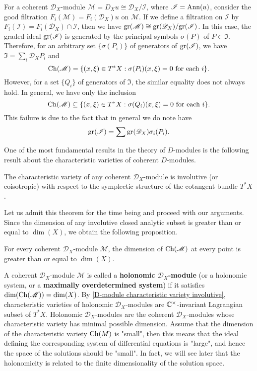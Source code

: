 \begin{example}
For a coherent $\mathscr{D}_X$-module $\mathscr{M}=D_Xu\cong\mathscr{D}_X/\mathscr{I}$, where $\mathscr{I}=\mathrm{Ann}(u)$, consider the good filtration $F_i(\mathscr{M})=F_i(\mathscr{D}_X)u$ on $\mathscr{M}$. If we define a filtration on $\mathscr{I}$ by $F_i(\mathscr{I})=F_i(\mathscr{D}_X)\cap\mathscr{I}$, then we have $\mathrm{gr}(\mathscr{M})\cong\mathrm{gr}(\mathscr{D}_X)/\mathrm{gr}(\mathscr{I})$. In this case, the graded ideal $\mathrm{gr}(\mathscr{I})$ is generated by the principal symbols $\sigma(P)$ of $P\in\mathfrak{I}$. Therefore, for an arbitrary set $\{\sigma(P_i)\}$ of generators of $\mathrm{gr}(\mathscr{I})$, we have $\mathfrak{I}=\sum_i\mathscr{D}_XP_i$ and
\[\mathrm{Ch}(\mathscr{M})=\{(x,\xi)\in T^*X:\text{$\sigma(P_i)(x,\xi)=0$ for each $i$}\}.\]
However, for a set $\{Q_i\}$ of generators of $\mathfrak{I}$, the similar equality does not always hold. In general, we have only the inclusion
\[\mathrm{Ch}(\mathscr{M})\subseteq\{(x,\xi)\in T^*X:\text{$\sigma(Q_i)(x,\xi)=0$ for each $i$}\}.\]
This failure is due to the fact that in general we do note have
\[\mathrm{gr}(\mathscr{I})=\sum\mathrm{gr}(\mathscr{D}_X)\sigma_i(P_i).\]
\end{example}

One of the most fundamental results in the theory of $D$-modules is the following result about the characteristic varieties of coherent $D$-modules.

\begin{theorem}\label{D-module characteristic variety involutive}
The characteristic variety of any coherent $\mathscr{D}_X$-module is involutive (or coisotropic) with respect to the symplectic structure of the cotangent bundle $T^*X$.
\end{theorem}

Let us admit this theorem for the time being and proceed with our arguments. Since the dimension of any involutive closed analytic subset is greater than or equal to $\dim(X)$, we obtain the following proposition.

\begin{proposition}\label{D-module characteristic variety dimension geq n}
For every coherent $\mathscr{D}_X$-module $\mathscr{M}$, the dimension of $\mathrm{Ch}(\mathscr{M})$ at every point is greater than or equal to $\dim(X)$.
\end{proposition}

A coherent $\mathscr{D}_X$-module $\mathscr{M}$ is called a \textbf{holonomic $\mathscr{D}_X$-module} (or a holonomic system, or a \textbf{maximally overdetermined system}) if it satisfies $\dim(\mathrm{Ch}(\mathscr{M}))=\dim(X)$. By \cref{D-module characteristic variety involutive}, characteristic varieties of holonomic $\mathscr{D}_X$-modules are $\mathbb{C}^\times$-invariant Lagrangian subset of $T^*X$. Holonomic $\mathscr{D}_X$-modules are the coherent $\mathscr{D}_X$-modules whose characteristic variety has minimal possible dimension. Assume that the dimension of the characteristic variety $\mathrm{Ch}(M)$ is "small", then this means that the ideal defining the corresponding system of differential equations is "large", and hence the space of the solutions should be "small". In fact, we will see later that the holonomicity is related to the finite dimensionality of the solution space.

